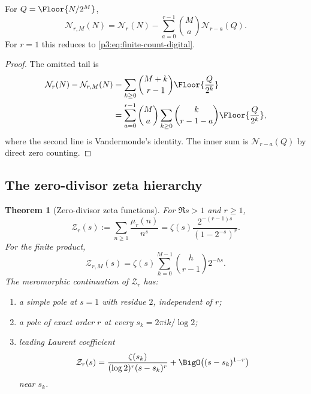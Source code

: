 \documentclass[11pt,oneside]{article}
\newtheorem{theorem}{Theorem}[section]
\theoremstyle{definition}
\theoremstyle{remark}
\begin{document}
\begin{proposition}\label{p3:prop:finite-tail-r}
For $Q=\Floor{N/2^M}$,
\begin{equation}\label{p3:eq:finite-tail-r}
 \mathcal N_{r,M}(N)
 =\mathcal N_r(N)-\sum_{a=0}^{r-1}\binom Ma\mathcal N_{r-a}(Q).
\end{equation}
For $r=1$ this reduces to \eqref{p3:eq:finite-count-digital}.
\end{proposition}

\begin{proof}
The omitted tail is
\begin{align*}
 \mathcal N_r(N)-\mathcal N_{r,M}(N)
 &=\sum_{k\ge0}\binom{M+k}{r-1}\Floor{\frac Q{2^k}}\\
 &=\sum_{a=0}^{r-1}\binom Ma
   \sum_{k\ge0}\binom{k}{r-1-a}\Floor{\frac Q{2^k}},
\end{align*}
where the second line is Vandermonde's identity.  The inner sum is $\mathcal N_{r-a}(Q)$ by direct zero counting.
\end{proof}

\subsection{The zero-divisor zeta hierarchy}

\begin{theorem}[Zero-divisor zeta functions]\label{p3:thm:zeta-r}
For $\Re s>1$ and $r\ge1$,
\begin{equation}\label{p3:eq:zeta-r}
  \mathcal Z_r(s):=\sum_{n\ge1}\frac{\mu_r(n)}{n^s}
  =\zeta(s)\frac{2^{-(r-1)s}}{(1-2^{-s})^r}.
\end{equation}
For the finite product,
\begin{equation}\label{p3:eq:zeta-rM}
  \mathcal Z_{r,M}(s)
  =\zeta(s)\sum_{h=0}^{M-1}\binom h{r-1}2^{-hs}.
\end{equation}
The meromorphic continuation of $\mathcal Z_r$ has:
\begin{enumerate}[label=(\roman*)]
\item a simple pole at $s=1$ with residue $2$, independent of $r$;
\item a pole of exact order $r$ at every $s_k=2\pi ik/\log2$;
\item leading Laurent coefficient
\begin{equation}\label{p3:eq:laurent-zeta-r}
  \mathcal Z_r(s)=
  \frac{\zeta(s_k)}{(\log2)^r(s-s_k)^r}
  +\BigO\!\left((s-s_k)^{1-r}\right)
\end{equation}
near $s_k$.
\end{enumerate}
\end{theorem}
\end{document}
